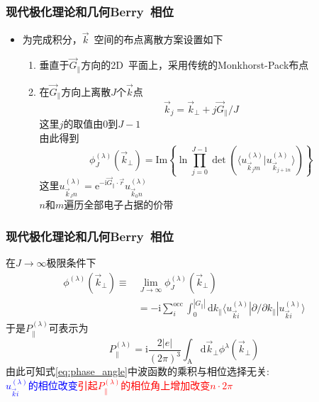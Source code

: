 {{\begin{itemize}
	\end{itemize}
}

\frame
{
	\frametitle{现代极化理论和几何\textrm{Berry~}相位}
	\begin{itemize}
		\item 为完成积分，$\vec k$~空间的布点离散方案设置如下
			\begin{enumerate}
				\item 垂直于$\vec G_{\lVert}$方向的2\textrm{D~}平面上，采用传统的\textrm{Monkhorst-Pack}布点
				\item 在$\vec G_{\lVert}$方向上离散$J$个$\vec k$点
\begin{displaymath}
	\vec k_j=\vec k_{\bot}+j\vec G_{\lVert}/J
\end{displaymath}
这里$j$的取值由0到$J-1$\\
由此得到
\begin{equation}
	\phi_J^{(\lambda)}(\vec k_{\bot})=\mathrm{Im}\left\{ \ln\prod_{j=0}^{J-1}\det(\langle u_{\vec k_j m}^{(\lambda)}|u_{\vec k_{j+1 n}}^{(\lambda)}\rangle) \right\}
	\label{eq:phase_angle}
\end{equation}
这里$u_{\vec k_J n}^{(\lambda)}=\mathrm{e}^{-\mathrm{i}\vec G_{\lVert}\cdot\vec r}u_{\vec k_0 n}^{(\lambda)}$\\
$n$和$m$遍历全部电子占据的价带
			\end{enumerate}
	\end{itemize}
}

\frame
{
	\frametitle{现代极化理论和几何\textrm{Berry~}相位}
	在$J\rightarrow\infty$极限条件下
	\begin{displaymath}
		\begin{aligned}
			\phi^{(\lambda)}(\vec k_{\bot})\equiv&\lim_{J\rightarrow\infty}\phi_J^{(\lambda)}(\vec k_{\bot})\\
			&=-\mathrm{i}\sum_{i}^{\mathrm{occ}}\int_0^{|G_{\lVert}|}\mathrm{d}k_{\lVert}\langle u_{\vec k i}^{(\lambda)}|\partial/\partial k_{\lVert}|u_{\vec k i}^{(\lambda)}\rangle
		\end{aligned}
	\end{displaymath}
	于是$P_{\lVert}^{(\lambda)}$可表示为
	\begin{displaymath}
		P_{\lVert}^{(\lambda)}=\mathrm{i}\frac{2|e|}{(2\pi)^3}\int_{\mathrm A}\mathrm{d}\vec k_{\bot}\phi^{\lambda}(\vec k_{\bot})
	\end{displaymath}
	由此可知式\eqref{eq:phase_angle}中波函数的乘积与相位选择无关:\\
	\textcolor{blue}{$u_{\vec k i}^{(\lambda)}$的相位改变}\textcolor{red}{引起$P_{\lVert}^{(\lambda)}$的相位角上增加改变$n\cdot2\pi$}
}

}
